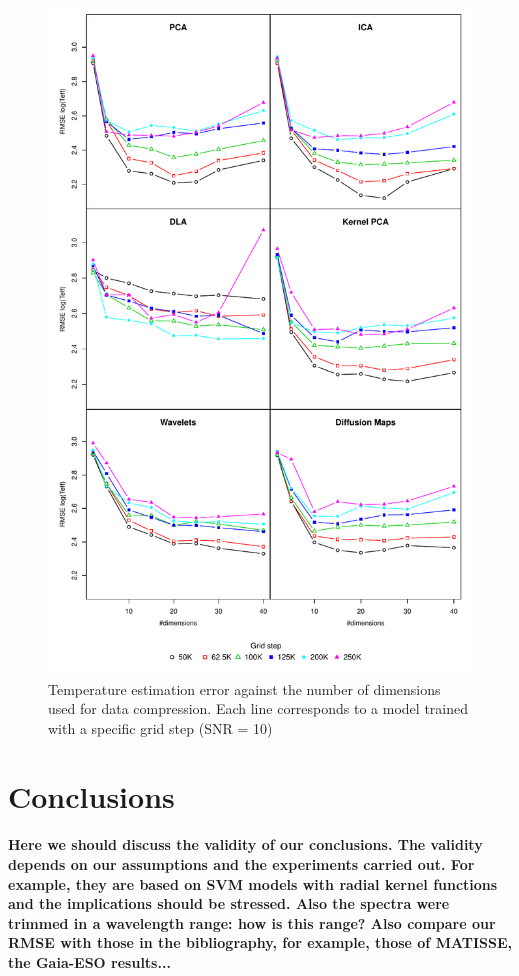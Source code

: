 \documentclass[a4paper,fleqn,usenatbib]{mnras}
\begin{document}
{{{\begin{figure}
\centering\includegraphics[height=0.95\textheight]{bestSVM_Teff_N-RMSE_HR10_snr=10_all.pdf}
\caption{Temperature estimation error against the number of dimensions
  used for data compression. Each line corresponds to a model trained
  with a specific grid step (SNR = 10)}
\label{fig:grid10}
\end{figure}




\section{Conclusions}
\label{sec:conclusions}

{\bf Here we should discuss the validity of our conclusions. The
  validity depends on our assumptions and the experiments carried
  out. For example, they are based on SVM models with radial kernel
  functions and the implications should be stressed. Also the spectra
  were trimmed in a wavelength range: how is this range? Also compare
  our RMSE with those in the bibliography, for example, those of
  MATISSE, the Gaia-ESO results...}

}}}
\end{document}
